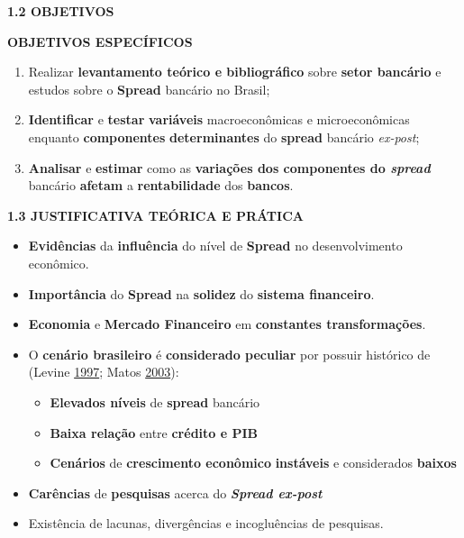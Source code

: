 \documentclass[ignorenonframetext,aspectratio=169,ignorenonframetext]{beamer}
\begin{document}
\begin{frame}{\textbf{1.2 OBJETIVOS}}
\protect\hypertarget{objetivos-1}{}

\textbf{OBJETIVOS ESPECÍFICOS}

\begin{enumerate}
\item
  Realizar \textbf{levantamento teórico e bibliográfico} sobre
  \textbf{setor bancário} e estudos sobre o \textbf{Spread} bancário no
  Brasil;
\item
  \textbf{Identificar} e \textbf{testar} \textbf{variáveis}
  macroeconômicas e microeconômicas enquanto \textbf{componentes}
  \textbf{determinantes} do \textbf{spread} bancário \emph{ex-post};
\item
  \textbf{Analisar} e \textbf{estimar} como as \textbf{variações dos
  componentes do \emph{spread}} bancário \textbf{afetam} a
  \textbf{rentabilidade} dos \textbf{bancos}.
\end{enumerate}

\end{frame}

\begin{frame}{\textbf{1.3 JUSTIFICATIVA TEÓRICA E PRÁTICA}}
\protect\hypertarget{justificativa-teuxf3rica-e-pruxe1tica}{}

\begin{itemize}
\item
  \textbf{Evidências} da \textbf{influência} do nível de \textbf{Spread}
  no desenvolvimento econômico.
\item
  \textbf{Importância} do \textbf{Spread} na \textbf{solidez} do
  \textbf{sistema financeiro}.
\item
  \textbf{Economia} e \textbf{Mercado Financeiro} em \textbf{constantes
  transformações}.
\item
  O \textbf{cenário brasileiro} é \textbf{considerado peculiar} por
  possuir histórico de (Levine
  \protect\hyperlink{ref-levine:1997}{1997}; Matos
  \protect\hyperlink{ref-matos:2003}{2003}):

  \begin{itemize}
  \item
    \textbf{Elevados níveis} de \textbf{spread} bancário
  \item
    \textbf{Baixa relação} entre \textbf{crédito e PIB}
  \item
    \textbf{Cenários} de \textbf{crescimento econômico}
    \textbf{instáveis} e considerados \textbf{baixos}
  \end{itemize}
\item
  \textbf{Carências} de \textbf{pesquisas} acerca do
  \textbf{\emph{Spread ex-post}}
\item
  Existência de lacunas, divergências e incogluências de pesquisas.
\end{itemize}

\end{frame}
\end{document}
